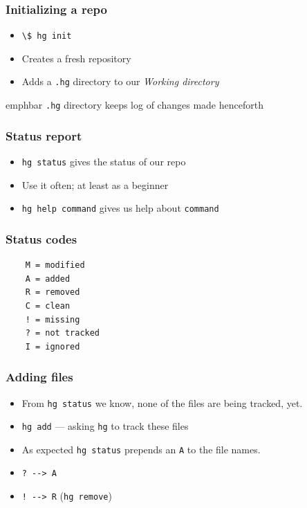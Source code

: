 \documentclass[14pt,compress]{beamer}
\newcommand{\emphbar}[1]
{\begin{beamercolorbox}[rounded=true]{emphbar} 
      {#1}
 \end{beamercolorbox}
}
\newcommand{\typ}[1]{\lstinline{#1}}
\begin{document}
\begin{frame}
  \frametitle{Initializing a repo}
  \begin{itemize}
  \item \typ{\$ hg init}
  \item Creates a fresh repository
  \item Adds a \typ{.hg} directory to our \emph{Working directory}
  \end{itemize}
  \emphbar{\typ{.hg} directory keeps log of changes made henceforth}
\end{frame}

\begin{frame}
  \frametitle{Status report}
  \begin{itemize}
  \item \typ{hg status} gives the status of our repo
  \item Use it often; at least as a beginner
  \item \typ{hg help command} gives us help about \typ{command}
  \end{itemize}
\end{frame}

\begin{frame}[fragile]
  \frametitle{Status codes}
  \begin{lstlisting}
    M = modified                                               
    A = added                                                  
    R = removed                                                
    C = clean                                                  
    ! = missing 
    ? = not tracked                                            
    I = ignored                                                
  \end{lstlisting}
\end{frame}

\begin{frame}
  \frametitle{Adding files}
  \begin{itemize}
  \item From \typ{hg status} we know, none of the files are being
    tracked, yet. 
  \item \typ{hg add} --- asking \typ{hg} to track these files
  \item As expected \typ{hg status} prepends an \typ{A} to the file
  names.
  \item \typ{? --> A} 
  \item \typ{! --> R} (\typ{hg remove})
  \end{itemize}
\end{frame}
\end{document}
